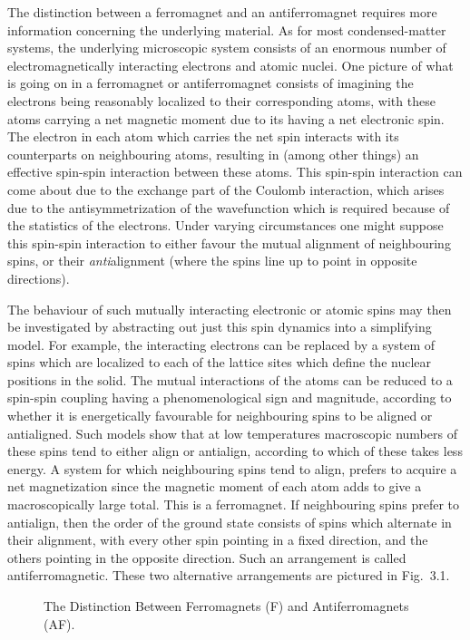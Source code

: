 \documentclass[12pt,epsf]{report}
\begin{document}
The distinction between a ferromagnet and an
antiferromagnet requires more information concerning the
underlying material. As for most condensed-matter systems,
the underlying microscopic system consists of an enormous
number of electromagnetically interacting electrons and
atomic nuclei. One picture of what is going on in a
ferromagnet or antiferromagnet consists of imagining the
electrons being reasonably localized to their corresponding
atoms, with these atoms carrying a net magnetic moment due
to its having a net electronic spin. The electron in each
atom which carries the net spin interacts with its
counterparts on neighbouring atoms, resulting in (among
other things) an effective spin-spin interaction between
these atoms. This spin-spin interaction can come about due
to the exchange part of the Coulomb interaction, which
arises due to the antisymmetrization of the wavefunction
which is required because of the statistics of the
electrons. Under varying circumstances one might suppose
this spin-spin interaction to either favour the mutual
alignment of neighbouring spins, or their {\em
anti}alignment (where the spins line up to point in
opposite directions).

The behaviour of such mutually interacting electronic or
atomic spins may then be investigated by abstracting out
just this spin dynamics into a simplifying model. For
example, the interacting electrons can be replaced by a
system of spins which are localized to each of the lattice
sites which define the nuclear positions in the solid. The
mutual interactions of the atoms can be reduced to a
spin-spin coupling having a phenomenological sign and
magnitude, according to whether it is energetically
favourable for neighbouring spins to be aligned or
antialigned. Such models show that at low temperatures
macroscopic numbers of these spins tend to either align or
antialign, according to which of these takes less energy. A
system for which neighbouring spins tend to align, prefers
to acquire a net magnetization since the magnetic moment of
each atom adds to give a macroscopically large total. This
is a ferromagnet. If neighbouring spins prefer to
antialign, then the order of the ground state consists of
spins which alternate in their alignment, with every other
spin pointing in a fixed direction, and the others pointing
in the opposite direction. Such an arrangement is called
antiferromagnetic. These two alternative arrangements are
pictured in Fig.~3.1.


\begin{figure}
\vspace{1in}
\caption{The Distinction Between Ferromagnets (F) and
Antiferromagnets (AF).}
\end{figure}
\end{document}

